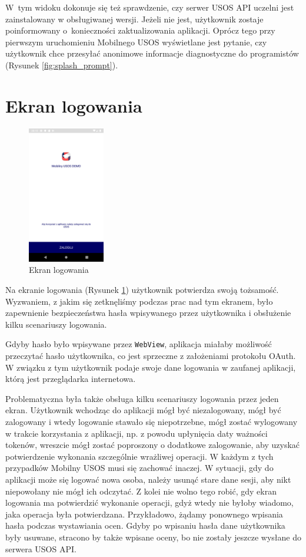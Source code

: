 \documentclass{pracamgr}
\begin{document}
W~tym widoku dokonuje się też sprawdzenie,
czy serwer USOS API uczelni jest zainstalowany w obsługiwanej wersji.
Jeżeli nie jest, użytkownik zostaje poinformowany o~konieczności zaktualizowania
aplikacji. Oprócz tego przy pierwszym uruchomieniu Mobilnego USOS wyświetlane jest
pytanie, czy użytkownik chce przesyłać anonimowe informacje diagnostyczne do programistów 
(Rysunek \ref{fig:splash_prompt}).


\section{Ekran logowania}

\begin{figure}[p]
	\centering
	\includegraphics[width=0.3\textwidth]{img/login.png}
	
	\caption{Ekran logowania}\label{fig:login}
	\medskip
\end{figure}

Na ekranie logowania (Rysunek \ref{fig:login}) użytkownik potwierdza swoją tożsamość. Wyzwaniem, z jakim się
zetknęliśmy podczas prac nad tym ekranem, było zapewnienie bezpieczeństwa hasła
wpisywanego przez użytkownika i obsłużenie kilku scenariuszy logowania.

Gdyby hasło było wpisywane przez \texttt{WebView}, aplikacja miałaby możliwość przeczytać hasło
użytkownika, co jest sprzeczne z założeniami protokołu OAuth. W związku z tym
użytkownik podaje swoje dane logowania w zaufanej aplikacji, którą jest przeglądarka
internetowa.

Problematyczna była także obsługa kilku scenariuszy logowania przez jeden ekran.
Użytkownik wchodząc do aplikacji mógł być niezalogowany, mógł być zalogowany i
wtedy logowanie stawało się niepotrzebne, mógł zostać wylogowany w trakcie korzystania
z aplikacji, np. z powodu upłynięcia daty ważności tokenów, wreszcie mógł zostać
poproszony o dodatkowe zalogowanie, aby uzyskać potwierdzenie wykonania szczególnie
wrażliwej operacji. W każdym z tych przypadków Mobilny USOS musi się zachować
inaczej. W sytuacji, gdy do aplikacji może się logować nowa osoba, należy usunąć
stare dane sesji, aby nikt niepowołany nie mógł ich odczytać. Z kolei nie wolno
tego robić, gdy ekran logowania ma potwierdzić wykonanie operacji, gdyż wtedy
nie byłoby wiadomo, jaka operacja była potwierdzana. Przykładowo, żądamy ponownego
wpisania hasła podczas wystawiania ocen. Gdyby po wpisaniu hasła dane użytkownika
były usuwane, stracono by także wpisane oceny, bo nie zostały jeszcze wysłane
do serwera USOS API.
\end{document}

